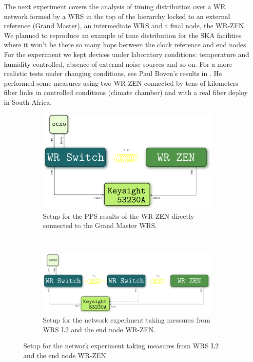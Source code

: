 The next experiment covers the analysis of timing distribution over a WR network formed by a WRS in the top of the hierarchy locked to an external reference (Grand Master), an intermediate WRS and a final node, the WR-ZEN. We planned to reproduce an example of time distribution for the SKA facilities where it won't be there so many hops between the clock reference and end nodes. For the experiment we kept devices under laboratory conditions: temperature and humidity controlled, absence of external noise sources and so on. For a more realistic tests under changing conditions, see Paul Boven's results in \cite{paultests}. He performed some measures using two WR-ZEN connected by tens of kilometers fiber links in controlled conditions (climate chamber) and with a real fiber deploy in South Africa.

\begin{figure}[H]
    \begin{subfigure}[t]{.35\textwidth}
        \centering
        \includegraphics[width=\textwidth]{img/prueba1_pps.png}
        \caption{Setup for the PPS results of the WR-ZEN directly connected to the Grand Master WRS.}
        \label{fig:prueba1_sch}
    \end{subfigure}
    ~
    \begin{subfigure}[t]{.60\textwidth}
        \centering
        \includegraphics[width=\textwidth]{img/prueba2-3_pps.png}
        \caption{Setup for the network experiment taking measures from WRS L2 and the end node WR-ZEN.}
        \label{fig:prueba2_sch}
    \end{subfigure}
\end{figure}

